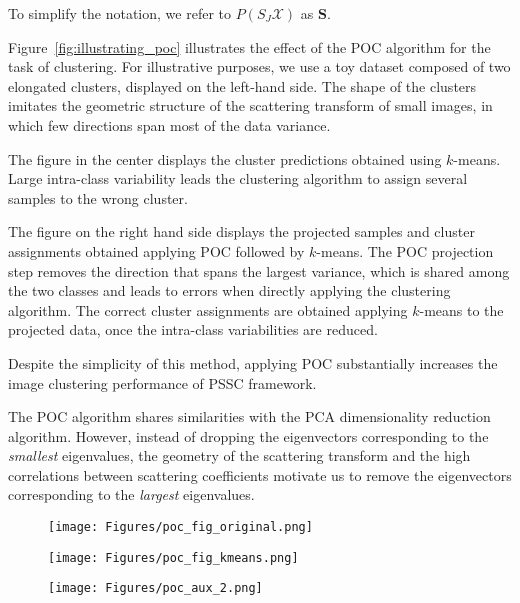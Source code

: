 \documentclass[11pt]{article}
\theoremstyle{definition}
\newcommand{\ScatteringFeatures}{S_J\mathcal{X}}
\newcommand{\DatasetSamples}{\mathbf{S}}
\newcommand{\Figure}[1]{Figure~\ref{#1}}
\begin{document}
To simplify the notation, we refer to $P(\ScatteringFeatures)$ as $\DatasetSamples$.

\Figure{fig:illustrating_poc} illustrates the effect of the POC algorithm for the task of clustering. For illustrative purposes, we use a toy dataset composed of two elongated clusters, displayed on the left-hand side. The shape of the clusters imitates the geometric structure of the scattering transform of small images, in which few directions span most of the data variance.

The figure in the center displays the cluster predictions obtained using $k$-means. Large intra-class variability leads the clustering algorithm to assign several samples to the wrong cluster.

The figure on the right hand side displays the projected samples and cluster assignments obtained applying POC followed by $k$-means. 
The POC projection step removes the direction that spans the largest variance, which is shared among the two classes and leads to errors when directly applying the clustering algorithm. 
The correct cluster assignments are obtained applying $k$-means to the projected data, once the intra-class variabilities are reduced.

Despite the simplicity of this method, applying POC substantially increases the image clustering performance of PSSC framework.

The POC algorithm shares similarities with the PCA dimensionality reduction algorithm. However, instead of dropping the eigenvectors corresponding to the \textit{smallest} eigenvalues, the geometry of the scattering transform and the high correlations between scattering coefficients motivate us to remove the eigenvectors corresponding to the \textit{largest} eigenvalues.

\begin{figure*}[bt]	
	\begin{subfigure}{0.33\textwidth}	
		\texttt{[image: Figures/poc\_fig\_original.png]}
		\label{fig:subfig1}
	\end{subfigure}
\begin{subfigure}{0.33\textwidth}
		\centering
		\texttt{[image: Figures/poc\_fig\_kmeans.png]}
		\label{fig:subfig2}
	\end{subfigure}
\begin{subfigure}{0.33\textwidth}
		\texttt{[image: Figures/poc\_aux\_2.png]}
		\label{fig:subfig1}
	\end{subfigure}
	\vspace{-0.3cm}
	\caption{Illustration of the POC step for clustering. Left-hand side figure displays a toy dataset composed of two elongated clusters. The figure in the center displays the predictions obtained using $k$-means. Right-hand side figure displays the projected samples and cluster assignments obtained applying POC followed by $k$-means. It is shown how the POC step reduces intra-class variabilities, simplifying the task of clustering.}
	\label{fig:illustrating_poc}
\end{figure*}
\end{document}
